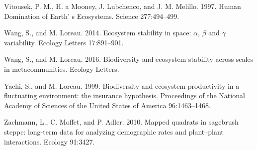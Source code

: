 \documentclass[12pt,]{article}
\begin{document}
Vitousek, P. M., H. a Mooney, J. Lubchenco, and J. M. Melillo. 1997.
Human Domination of Earth' s Ecosystems. Science 277:494--499.

Wang, S., and M. Loreau. 2014. Ecosystem stability in space: \(\alpha\),
\(\beta\) and \(\gamma\) variability. Ecology Letters 17:891--901.

Wang, S., and M. Loreau. 2016. Biodiversity and ecosystem stability
across scales in metacommunities. Ecology Letters.

Yachi, S., and M. Loreau. 1999. Biodiversity and ecosystem productivity
in a fluctuating environment: the insurance hypothesis. Proceedings of
the National Academy of Sciences of the United States of America
96:1463--1468.

Zachmann, L., C. Moffet, and P. Adler. 2010. Mapped quadrats in
sagebrush steppe: long-term data for analyzing demographic rates and
plant--plant interactions. Ecology 91:3427.
\end{document}
